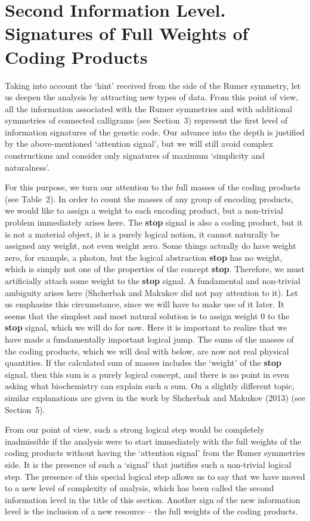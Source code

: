 \documentclass[12pt]{article}
\begin{document}
\section{Second Information Level. Signatures of Full Weights of Coding Products}

Taking into account the `hint' received from the side of the Rumer symmetry, let us deepen the analysis by attracting new types of data. From this point of view, all the information associated with the Rumer symmetries and with additional symmetries of connected calligrams (see Section~3) represent the first level of information signatures of the genetic code. Our advance into the depth is justified by the above-mentioned `attention signal', but we will still avoid complex constructions and consider only signatures of maximum `simplicity and naturalness'.

For this purpose, we turn our attention to the full masses of the coding products (see Table~2). In order to count the masses of any group of encoding products, we would like to assign a weight to each encoding product, but a non-trivial problem immediately arises here. The \textbf{stop} signal is also a coding product, but it is not a material object, it is a purely logical notion, it cannot naturally be assigned any weight, not even weight zero. Some things actually do have weight zero, for example, a photon, but the logical abstraction \textbf{stop} has no weight, which is simply not one of the properties of the concept \textbf{stop}. Therefore, we must artificially attach some weight to the \textbf{stop} signal. A fundamental and non-trivial ambiguity arises here (Shcherbak and Makukov did not pay attention to it). Let us emphasize this circumstance, since we will have to make use of it later. It seems that the simplest and most natural solution is to assign weight 0 to the \textbf{stop} signal, which we will do for now. Here it is important to realize that we have made a fundamentally important logical jump. The sums of the masses of the coding products, which we will deal with below, are now not real physical quantities. If the calculated sum of masses includes the `weight' of the \textbf{stop} signal, then this sum is a purely logical concept, and there is no point in even asking what biochemistry can explain such a sum. On a slightly different topic, similar explanations are given in the work by Shcherbak and Makukov (2013) (see Section~5).

From our point of view, such a strong logical step would be completely inadmissible if the analysis were to start immediately with the full weights of the coding products without having the `attention signal' from the Rumer symmetries side. It is the presence of such a `signal' that justifies such a non-trivial logical step. The presence of this special logical step allows us to say that we have moved to a new level of complexity of analysis, which has been called the second information level in the title of this section. Another sign of the new information level is the inclusion of a new resource -- the full weights of the coding products.
\end{document}
